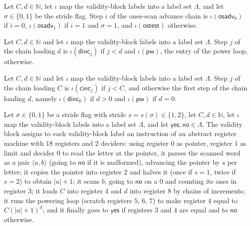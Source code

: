 \begin{definition}
\label{Complexity.epadOsAdv}
\leanok
{}
Let $C, d \in \mathbb{N}$, let $\iota$ map the validity-block labels into a label set $\Lambda$,
and let $\sigma \in \{0,1\}$ be the stride flag. Step $i$ of the ones-scan advance chain is
$\iota(\mathsf{osadv}_0)$ if $i = 0$, $\iota(\mathsf{osadv}_1)$ if $i = 1$ and $\sigma = 1$, and
$\iota(\mathsf{ostest})$ otherwise.
\end{definition}

\begin{definition}
\label{Complexity.epadDI}
\leanok
{}
Let $C, d \in \mathbb{N}$ and let $\iota$ map the validity-block labels into a label set
$\Lambda$. Step $j$ of the chain loading $d$ is $\iota(\mathsf{dinc}_j)$ if $j < d$ and
$\iota(\mathsf{pw})$, the entry of the power loop, otherwise.
\end{definition}

\begin{definition}
\label{Complexity.epadCI}
\leanok
{}
Let $C, d \in \mathbb{N}$ and let $\iota$ map the validity-block labels into a label set
$\Lambda$. Step $j$ of the chain loading $C$ is $\iota(\mathsf{cinc}_j)$ if $j < C$, and otherwise
the first step of the chain loading $d$, namely $\iota(\mathsf{dinc}_0)$ if $d > 0$ and
$\iota(\mathsf{pw})$ if $d = 0$.
\end{definition}

\begin{definition}
\label{Complexity.epadValCode}
\leanok
{}
Let $\sigma \in \{0,1\}$ be a stride flag with stride $s = s(\sigma) \in \{1,2\}$, let
$C, d \in \mathbb{N}$, let $\iota$ map the validity-block labels into a label set $\Lambda$, and
let $\mathsf{yes}, \mathsf{no} \in \Lambda$. The validity block assigns to each validity-block
label an instruction of an abstract register machine with $18$ registers and $2$ deciders: using
register $0$ as pointer, register $1$ as limit and decider $0$ to read the letter at the
pointer, it parses the scanned word as a pair $\langle a,b\rangle$ (going to $\mathsf{no}$ if it
is malformed), advancing the pointer by $s$ per letter; it copies the pointer into register $2$
and halves it (once if $s = 1$, twice if $s = 2$) to obtain $|a|+1$; it scans $b$, going to $\mathsf{no}$ on a
$0$ and counting its ones in register $3$; it loads $C$ into register $4$ and $d$ into register
$8$ by chains of increments; it runs the powering loop (scratch registers $5$, $6$, $7$) to make
register $4$ equal to $C(|a|+1)^d$; and it finally goes to $\mathsf{yes}$ if registers $3$ and $4$
are equal and to $\mathsf{no}$ otherwise.
\end{definition}

